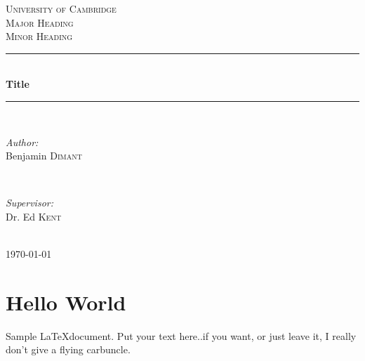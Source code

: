 \documentclass[a4paper,12pt,oneside]{article}
\begin{document}
\begin{titlepage}

\newcommand{\HRule}{\rule{\linewidth}{0.5mm}}
\center
\textsc{\LARGE University of Cambridge}\\[1.5cm] %
\textsc{\Large Major Heading}\\[0.5cm] %
\textsc{\large Minor Heading}\\[0.5cm] %

\HRule \\[0.4cm]
{ \huge \bfseries Title}\\[0.4cm] %
\HRule \\[1.5cm]

\begin{minipage}{0.4\textwidth}
\begin{flushleft} \large
\emph{Author:}\\
Benjamin  \textsc{Dimant} %
\end{flushleft}
\end{minipage}
~
\begin{minipage}{0.4\textwidth}
\begin{flushright} \large
\emph{Supervisor:} \\
Dr. Ed \textsc{Kent} %
\end{flushright}
\end{minipage}\\[4cm]


{\large \today}\\[3cm] %


\vfill

\end{titlepage}

\thispagestyle{fancy}
\tableofcontents
\newpage

\section{Hello World}

Sample \LaTeX document. Put your text here..if you want, or just leave it, I really don't give a flying carbuncle.
\end{document}
